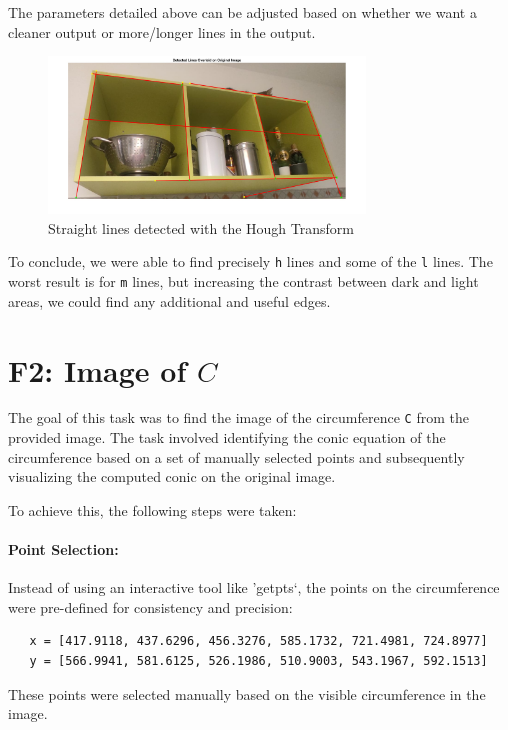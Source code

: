The parameters detailed above can be adjusted based on whether we want a cleaner output or more/longer lines in the output.

\begin{figure}[H]
    \centering
    \includegraphics[width=0.75\textwidth]{img/imageProcessing/DetectedLines.jpg}
    \caption{Straight lines detected with the Hough Transform}
    \label{fig:detectStraightLines}
\end{figure}

To conclude, we were able to find precisely \verb|h| lines and some of the \verb|l| lines. The worst result is for \verb|m| lines, but increasing the contrast between dark and light areas, we could find any additional and useful edges.

\section[F2: Image of \textit{C}]{F2: Image of $C$}\label{sec:detectedC}
The goal of this task was to find the image of the circumference \verb|C| from the provided image. The task involved identifying the conic equation of the circumference based on a set of manually selected points and subsequently visualizing the computed conic on the original image.

To achieve this, the following steps were taken:

\paragraph{Point Selection:} Instead of using an interactive tool like 'getpts`, the points on the circumference were pre-defined for consistency and precision:
\begin{verbatim}
   x = [417.9118, 437.6296, 456.3276, 585.1732, 721.4981, 724.8977]
   y = [566.9941, 581.6125, 526.1986, 510.9003, 543.1967, 592.1513]
\end{verbatim}
These points were selected manually based on the visible circumference in the image.

